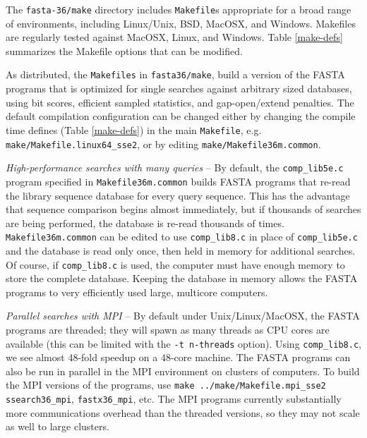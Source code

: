 \documentclass[11pt]{article}
\begin{document}
The \texttt{fasta-36/make} directory includes \texttt{Makefile}s
appropriate for a broad range of environments, including Linux/Unix,
BSD, MacOSX, and Windows.  Makefiles are regularly tested against
MacOSX, Linux, and Windows. Table \ref{make-defs} summarizes the
Makefile options that can be modified.

As distributed, the \texttt{Makefiles} in \texttt{fasta36/make}, build
a version of the FASTA programs that is optimized for single searches
against arbitrary sized databases, using bit scores, efficient sampled
statistics, and gap-open/extend penalties.  The default compilation
configuration can be changed either by changing the compile time
defines (Table \ref{make-defs}) in the main \texttt{Makefile},
e.g. \texttt{make/Makefile.linux64\_sse2}, or by editing
\texttt{make/Makefile36m.common}.

\emph{High-performance searches with many queries} -- By default, the
\texttt{comp\_lib5e.c} program specified in
\texttt{Makefile36m.common} builds FASTA programs that re-read the
library sequence database for every query sequence.  This has the
advantage that sequence comparison begins almost immediately, but if
thousands of searches are being performed, the database is re-read
thousands of times.  \texttt{Makefile36m.common} can be edited to use
\texttt{comp\_lib8.c} in place of \texttt{comp\_lib5e.c} and the
database is read only once, then held in memory for additional
searches.  Of course, if \texttt{comp\_lib8.c} is used, the computer
must have enough memory to store the complete database.  Keeping the
database in memory allows the FASTA programs to very efficiently used
large, multicore computers.

\emph{Parallel searches with MPI} -- By default under
Unix/Linux/MacOSX, the FASTA programs are threaded; they will spawn as
many threads as CPU cores are available (this can be limited with the
\texttt{-t n-threads} option).  Using \texttt{comp\_lib8.c}, we see
almost 48-fold speedup on a 48-core machine.  The FASTA programs can
also be run in parallel in the MPI environment on clusters of
computers.  To build the MPI versions of the programs, use
\texttt{make ../make/Makefile.mpi\_sse2 ssearch36\_mpi},
\texttt{fastx36\_mpi}, etc.  The MPI programs currently substantially
more communications overhead than the threaded versions, so they may
not scale as well to large clusters.


\end{document}
